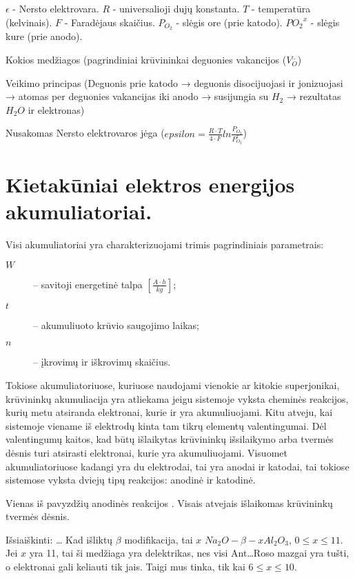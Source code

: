 $\epsilon$ - Nersto elektrovara.
$R$ - universalioji dujų konstanta.
$T$ - temperatūra (kelvinais).
$F$ - Faradėjaus skaičius.
$P_{O_2}$ - slėgis ore (prie katodo).
$P{O_2}^x$ - slėgis kure (prie anodo).

\begin{remember}
  \item Kokios medžiagos (pagrindiniai krūvininkai deguonies vakancijos
  ($V_{O}^{..}$) 
  \item Veikimo principas (Deguonis prie katodo → deguonis
  disocijuojasi ir jonizuojasi →  atomas per deguonies vakancijas
  iki anodo → susijungia su $H_2$ → rezultatas $H_2 O$ ir elektronas)
  \item Nusakomas Nersto elektrovaros jėga
  ($epsilon = \frac{R \cdot T}{4 \cdot F}ln \frac{P_{O_2}}{P_{O_2}^x}$)
\end{remember}

\section{Kietakūniai elektros energijos akumuliatoriai.}

Visi akumuliatoriai yra charakterizuojami trimis pagrindiniais parametrais:
\begin{description}
  \item[$W$]  – savitoji energetinė talpa
    $\left[ \frac{A \cdot h}{kg} \right]$;
  \item[$t$] – akumuliuoto krūvio saugojimo laikas;
  \item[$n$] – įkrovimų ir iškrovimų skaičius.
\end{description}

Tokiose akumuliatoriuose, kuriuose naudojami vienokie ar kitokie
superjonikai, krūvininkų akumuliacija yra atliekama jeigu sistemoje
vyksta cheminės reakcijos, kurių metu atsiranda elektronai, kurie
ir yra akumuliuojami. Kitu atveju, kai sistemoje viename iš
elektrodų kinta tam tikrų elementų valentingumai. Dėl valentingumų
kaitos, kad būtų išlaikytas krūvininkų išsilaikymo arba tvermės
dėsnis turi atsirasti elektronai, kurie yra akumuliuojami.
Visuomet akumuliatoriuose kadangi yra du elektrodai, tai yra anodai
ir katodai, tai tokiose sistemose vyksta dviejų tipų reakcijos:
anodinė ir katodinė.

Vienas iš pavyzdžių anodinės reakcijos .
Visais atvejais išlaikomas krūvininkų tvermės dėsnis.

Išsiaiškinti:
…
Kad išliktų $\beta$ modifikacija, tai $x$ $Na_{2}O-\beta-x Al_{2}O_{3}$,
$0 \leq x \leq 11$. Jei $x$ yra 11, tai ši medžiaga yra delektrikas,
nes visi Ant…Roso mazgai yra tušti, o elektronai gali keliauti tik
jais. Taigi mus tinka, tik kai $6 \leq x \leq 10$.

